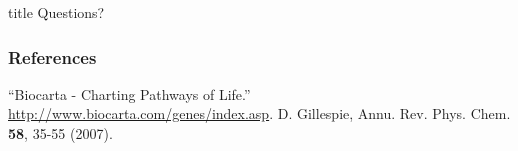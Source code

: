 \documentclass[xcolor={usenames,dvipsnames,svgnames}]{beamer}
\begin{document}
\begin{frame}[plain]

\hfill
    \begin{beamercolorbox}[rounded=true, center, shadow=true,wd=6cm]{title}
        \huge Questions?
    \end{beamercolorbox}
\hfill\hfill

\end{frame}

\appendix

\begin{frame}
    \frametitle{References}
    \begin{thebibliography}{9}
         ``Biocarta - Charting Pathways of Life.'' \url{http://www.biocarta.com/genes/index.asp}.
         D. Gillespie, Annu. Rev. Phys. Chem. \textbf{58}, 35-55 (2007).
        
    \end{thebibliography}
\end{frame}
\end{document}
